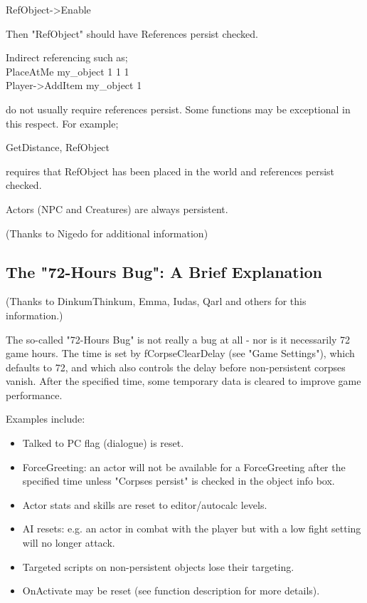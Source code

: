 \documentclass[
]{article}
\begin{document}
RefObject-\textgreater Enable

Then "RefObject" should have References persist checked.

Indirect referencing such as;\\
PlaceAtMe my\_object 1 1 1\\
Player-\textgreater AddItem my\_object 1

do not usually require references persist. Some functions may be
exceptional in this respect. For example;

GetDistance, RefObject

requires that RefObject has been placed in the world and references
persist checked.

Actors (NPC and Creatures) are always persistent.

(Thanks to Nigedo for additional information)

\hypertarget{the-72-hours-bug-a-brief-explanation}{%
\subsection{The "72-Hours Bug": A Brief
Explanation}\label{the-72-hours-bug-a-brief-explanation}}

(Thanks to DinkumThinkum, Emma, Iudas, Qarl and others for this
information.)

The so-called "72-Hours Bug" is not really a bug at all - nor is it
necessarily 72 game hours. The time is set by fCorpseClearDelay (see
"Game Settings"), which defaults to 72, and which also controls the
delay before non-persistent corpses vanish. After the specified time,
some temporary data is cleared to improve game performance.

Examples include:

\begin{itemize}
\item
  Talked to PC flag (dialogue) is reset.
\item
  ForceGreeting: an actor will not be available for a ForceGreeting
  after the specified time unless "Corpses persist" is checked in the
  object info box.
\item
  Actor stats and skills are reset to editor/autocalc levels.
\item
  AI resets: e.g. an actor in combat with the player but with a low
  fight setting will no longer attack.
\item
  Targeted scripts on non-persistent objects lose their targeting.
\item
  OnActivate may be reset (see function description for more details).
\end{itemize}
\end{document}
